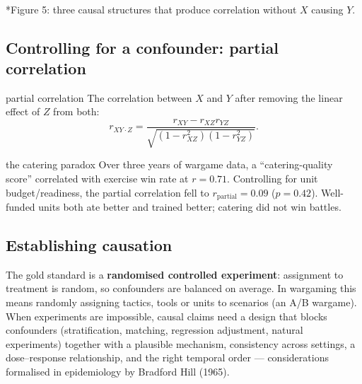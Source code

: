 \documentclass[11pt]{article}
\begin{document}
\begin{center}\\*{\small\color{GreyN}Figure 5: three causal structures that produce correlation without $X$ causing $Y$.}\end{center}

\subsection{Controlling for a confounder: partial correlation}
\begin{definition}{partial correlation}
The correlation between $X$ and $Y$ after removing the linear effect of $Z$ from both:
\[r_{XY\cdot Z}=\frac{r_{XY}-r_{XZ}r_{YZ}}{\sqrt{(1-r_{XZ}^2)(1-r_{YZ}^2)}}.\]
\end{definition}
\begin{example}{the catering paradox}
Over three years of wargame data, a ``catering-quality score'' correlated with exercise win rate at $r=0.71$. Controlling for unit budget/readiness, the partial correlation fell to $r_{\text{partial}}=0.09$ ($p=0.42$). Well-funded units both ate better and trained better; catering did not win battles.
\end{example}

\subsection{Establishing causation}
The gold standard is a \textbf{randomised controlled experiment}: assignment to treatment is random, so confounders are balanced on average. In wargaming this means randomly assigning tactics, tools or units to scenarios (an A/B wargame). When experiments are impossible, causal claims need a design that blocks confounders (stratification, matching, regression adjustment, natural experiments) together with a plausible mechanism, consistency across settings, a dose--response relationship, and the right temporal order --- considerations formalised in epidemiology by Bradford Hill (1965).
\end{document}
